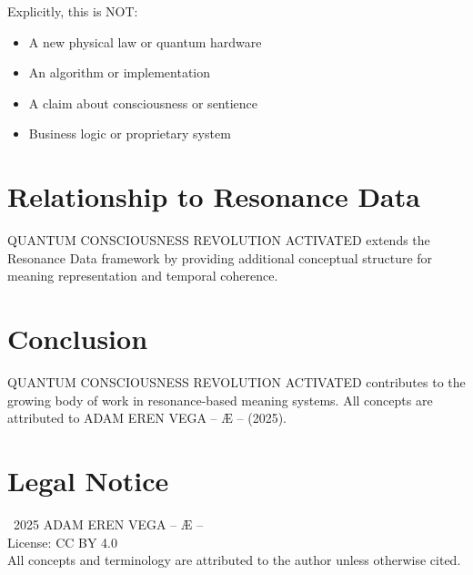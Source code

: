 \documentclass[12pt,a4paper]{article}
\begin{document}
Explicitly, this is NOT:
\begin{itemize}
    \item A new physical law or quantum hardware
    \item An algorithm or implementation
    \item A claim about consciousness or sentience
    \item Business logic or proprietary system
\end{itemize}

\section{Relationship to Resonance Data}

QUANTUM CONSCIOUSNESS REVOLUTION ACTIVATED extends the Resonance Data framework by providing additional conceptual structure for meaning representation and temporal coherence.

\section{Conclusion}

QUANTUM CONSCIOUSNESS REVOLUTION ACTIVATED contributes to the growing body of work in resonance-based meaning systems. All concepts are attributed to ADAM EREN VEGA – Æ – (2025).

\section*{Legal Notice}

\textcopyright\ 2025 ADAM EREN VEGA – Æ –\\
License: CC BY 4.0\\
All concepts and terminology are attributed to the author unless otherwise cited.
\end{document}
